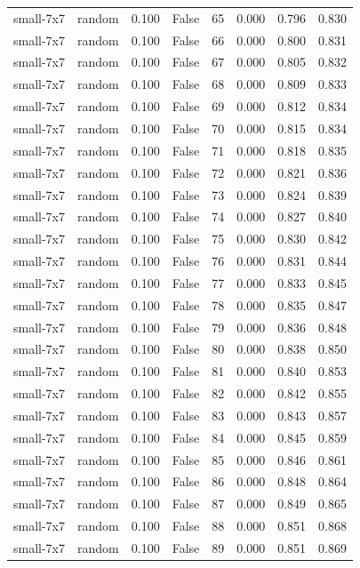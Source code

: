 \begin{tabular}{llrrrrrr}
small-7x7 & random & 0.100 & False & 65 & 0.000 & 0.796 & 0.830 \\
small-7x7 & random & 0.100 & False & 66 & 0.000 & 0.800 & 0.831 \\
small-7x7 & random & 0.100 & False & 67 & 0.000 & 0.805 & 0.832 \\
small-7x7 & random & 0.100 & False & 68 & 0.000 & 0.809 & 0.833 \\
small-7x7 & random & 0.100 & False & 69 & 0.000 & 0.812 & 0.834 \\
small-7x7 & random & 0.100 & False & 70 & 0.000 & 0.815 & 0.834 \\
small-7x7 & random & 0.100 & False & 71 & 0.000 & 0.818 & 0.835 \\
small-7x7 & random & 0.100 & False & 72 & 0.000 & 0.821 & 0.836 \\
small-7x7 & random & 0.100 & False & 73 & 0.000 & 0.824 & 0.839 \\
small-7x7 & random & 0.100 & False & 74 & 0.000 & 0.827 & 0.840 \\
small-7x7 & random & 0.100 & False & 75 & 0.000 & 0.830 & 0.842 \\
small-7x7 & random & 0.100 & False & 76 & 0.000 & 0.831 & 0.844 \\
small-7x7 & random & 0.100 & False & 77 & 0.000 & 0.833 & 0.845 \\
small-7x7 & random & 0.100 & False & 78 & 0.000 & 0.835 & 0.847 \\
small-7x7 & random & 0.100 & False & 79 & 0.000 & 0.836 & 0.848 \\
small-7x7 & random & 0.100 & False & 80 & 0.000 & 0.838 & 0.850 \\
small-7x7 & random & 0.100 & False & 81 & 0.000 & 0.840 & 0.853 \\
small-7x7 & random & 0.100 & False & 82 & 0.000 & 0.842 & 0.855 \\
small-7x7 & random & 0.100 & False & 83 & 0.000 & 0.843 & 0.857 \\
small-7x7 & random & 0.100 & False & 84 & 0.000 & 0.845 & 0.859 \\
small-7x7 & random & 0.100 & False & 85 & 0.000 & 0.846 & 0.861 \\
small-7x7 & random & 0.100 & False & 86 & 0.000 & 0.848 & 0.864 \\
small-7x7 & random & 0.100 & False & 87 & 0.000 & 0.849 & 0.865 \\
small-7x7 & random & 0.100 & False & 88 & 0.000 & 0.851 & 0.868 \\
small-7x7 & random & 0.100 & False & 89 & 0.000 & 0.851 & 0.869 \\

\end{tabular}
